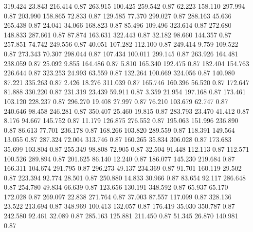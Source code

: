  319.424   23.843  216.414         0.87
 263.915  100.425  259.542         0.87
  62.223  158.110  297.994         0.87
 203.990  158.865   72.833         0.87
 129.585   77.370  299.027         0.87
 288.163   45.636  265.438         0.87
  24.041   34.066  168.823         0.87
  85.496  109.496  323.614         0.87
 272.680  148.833  287.661         0.87
  87.874  163.631  322.443         0.87
  32.182   98.660  144.357         0.87
 257.851   74.742  249.556         0.87
  40.051  107.282  112.100         0.87
 249.414    9.759  109.522         0.87
 273.343   70.307  298.044         0.87
 107.434  100.011  299.145         0.87
 263.926  164.481  238.059         0.87
  25.092    9.855  164.486         0.87
   5.810  165.340  192.475         0.87
 182.404  154.763  226.644         0.87
 323.253   24.993   63.559         0.87
 132.264  100.669  324.056         0.87
 140.980   87.221  335.263         0.87
   2.426   18.276  311.039         0.87
 165.746  160.396   56.520         0.87
 172.647   81.888  330.220         0.87
 231.319   23.439   59.911         0.87
   3.359   21.954  197.168         0.87
 173.461  103.120  228.237         0.87
 296.270   19.408   27.997         0.87
  76.210  103.679   62.747         0.87
 240.646   98.458  246.281         0.87
 350.407   25.460   19.815         0.87
 283.793   23.470   41.412         0.87
   8.176   94.667  145.752         0.87
  11.179  126.875  276.552         0.87
 195.063  151.996  236.890         0.87
  86.613   77.701  236.178         0.87
 168.266  103.820  289.559         0.87
 118.391  149.564   13.055         0.87
 287.324   72.004  313.746         0.87
 160.265   35.834  306.028         0.87
 173.683   35.699  103.804         0.87
 255.349   98.808   72.905         0.87
  32.504   91.448  112.113         0.87
 112.571  100.526  289.894         0.87
 201.625   86.140   12.240         0.87
 186.077  145.230  219.684         0.87
 166.311  104.674  291.795         0.87
 296.273   49.137  234.369         0.87
  91.701  160.119   29.502         0.87
 223.394   92.774   28.501         0.87
 250.880   14.833   30.966         0.87
  83.654   92.117  286.648         0.87
 254.780   49.834   66.639         0.87
 123.656  130.191  348.592         0.87
  65.937   65.170  172.028         0.87
 269.097   22.838  271.764         0.87
  37.003   87.557  117.099         0.87
 328.136   23.522  213.694         0.87
 348.969  100.413  132.057         0.87
 176.419   35.030  350.787         0.87
 242.580   92.461   32.089         0.87
 285.163  125.881  211.450         0.87
  51.345   26.870  140.981         0.87
